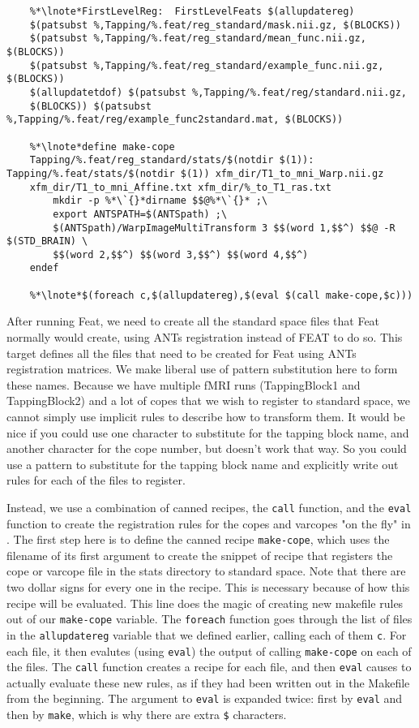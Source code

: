 \begin{lstlisting}
	%*\lnote*FirstLevelReg:  FirstLevelFeats $(allupdatereg) 
	$(patsubst %,Tapping/%.feat/reg_standard/mask.nii.gz, $(BLOCKS)) 
	$(patsubst %,Tapping/%.feat/reg_standard/mean_func.nii.gz, $(BLOCKS)) 
	$(patsubst %,Tapping/%.feat/reg_standard/example_func.nii.gz, $(BLOCKS)) 
	$(allupdatetdof) $(patsubst %,Tapping/%.feat/reg/standard.nii.gz, 
	$(BLOCKS)) $(patsubst %,Tapping/%.feat/reg/example_func2standard.mat, $(BLOCKS)) 

	%*\lnote*define make-cope
	Tapping/%.feat/reg_standard/stats/$(notdir $(1)): Tapping/%.feat/stats/$(notdir $(1)) xfm_dir/T1_to_mni_Warp.nii.gz 
	xfm_dir/T1_to_mni_Affine.txt xfm_dir/%_to_T1_ras.txt
		mkdir -p %*\`{}*dirname $$@%*\`{}* ;\
		export ANTSPATH=$(ANTSpath) ;\
		$(ANTSpath)/WarpImageMultiTransform 3 $$(word 1,$$^) $$@ -R $(STD_BRAIN) \
		$$(word 2,$$^) $$(word 3,$$^) $$(word 4,$$^)
	endef

	%*\lnote*$(foreach c,$(allupdatereg),$(eval $(call make-cope,$c)))
\end{lstlisting}
After running Feat, we need to create all the standard space files
that Feat normally would create, using ANTs registration instead of
FEAT to do so. \lnum{14} This target defines all the files that need to be created for Feat using
ANTs registration matrices. We make liberal use of pattern
substitution here to form these names. \lnum{15} Because we have
multiple fMRI runs (TappingBlock1 and TappingBlock2) and a lot of
copes that we wish to register to standard space, we cannot simply use
implicit rules to describe how to transform them. It would be nice if
you could use one character to substitute for the tapping block name,
and another character for the cope number, but \maken{} doesn't work
that way. So you could use a pattern to substitute for the tapping
block name and explicitly write out rules for each of the files to
register. 

Instead, we use a combination of canned recipes, the \texttt{call}
function, and the \texttt{eval} function to create the registration
rules for the copes and varcopes "on the fly" in \maken{}. The first
step here is to define the canned recipe \texttt{make-cope}, which
uses the filename of its first argument to create the snippet of
recipe that registers the cope or varcope file in the stats directory
to standard space. Note that there are two dollar signs for every one
in the recipe. This is necessary because of how this recipe will be
evaluated. \lnum{16} This line does the magic of creating new makefile
rules out of our \texttt{make-cope} variable. The \texttt{foreach}
function goes through the list of files in the \texttt{allupdatereg}
variable that we defined earlier, calling each of them \texttt{c}. For
each file, it then evalutes (using \texttt{eval}) the output of
calling \texttt{make-cope} on each of the files.  The \texttt{call}
function creates a \maken{} recipe for each file, and then
\texttt{eval} causes \maken{} to actually evaluate these new rules, as
if they had been written out in the Makefile from the beginning. 
The argument to \texttt{eval} is expanded twice: first by
\texttt{eval} and then by \texttt{make}, which is why there are extra
\texttt{\$} characters. 

